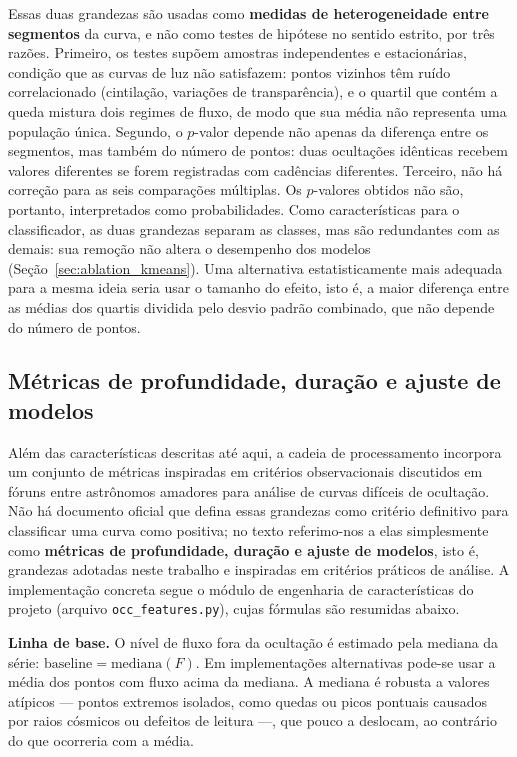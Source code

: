 Essas duas grandezas são usadas como \textbf{medidas de heterogeneidade entre segmentos} da curva, e não como testes de hipótese no sentido estrito, por três razões. Primeiro, os testes supõem amostras independentes e estacionárias, condição que as curvas de luz não satisfazem: pontos vizinhos têm ruído correlacionado (cintilação, variações de transparência), e o quartil que contém a queda mistura dois regimes de fluxo, de modo que sua média não representa uma população única. Segundo, o \(p\)-valor depende não apenas da diferença entre os segmentos, mas também do número de pontos: duas ocultações idênticas recebem valores diferentes se forem registradas com cadências diferentes. Terceiro, não há correção para as seis comparações múltiplas. Os \(p\)-valores obtidos não são, portanto, interpretados como probabilidades. Como características para o classificador, as duas grandezas separam as classes, mas são redundantes com as demais: sua remoção não altera o desempenho dos modelos (Seção~\ref{sec:ablation_kmeans}). Uma alternativa estatisticamente mais adequada para a mesma ideia seria usar o tamanho do efeito, isto é, a maior diferença entre as médias dos quartis dividida pelo desvio padrão combinado, que não depende do número de pontos.

\subsection{Métricas de profundidade, duração e ajuste de modelos}

Além das características descritas até aqui, a cadeia de processamento incorpora um conjunto de métricas inspiradas em critérios observacionais discutidos em fóruns entre astrônomos amadores para análise de curvas difíceis de ocultação. Não há documento oficial que defina essas grandezas como critério definitivo para classificar uma curva como positiva; no texto referimo-nos a elas simplesmente como \textbf{métricas de profundidade, duração e ajuste de modelos}, isto é, grandezas adotadas neste trabalho e inspiradas em critérios práticos de análise. A implementação concreta segue o módulo de engenharia de características do projeto (arquivo \texttt{occ\_features.py}), cujas fórmulas são resumidas abaixo.

\textbf{Linha de base.} O nível de fluxo fora da ocultação é estimado pela mediana da série: \(\mathrm{baseline} = \mathrm{mediana}(F)\). Em implementações alternativas pode-se usar a média dos pontos com fluxo acima da mediana. A mediana é robusta a valores atípicos --- pontos extremos isolados, como quedas ou picos pontuais causados por raios cósmicos ou defeitos de leitura ---, que pouco a deslocam, ao contrário do que ocorreria com a média.

